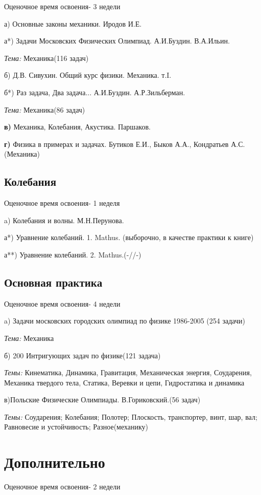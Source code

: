 \documentclass{article}
\begin{document}
\large{Оценочное время освоения- 3 недели

а) Основные законы механики. Иродов И.Е.

а*) Задачи Московских Физических Олимпиад. А.И.Буздин. В.А.Ильин.

\textit{Тема:} Механика(116 задач)

б) Д.В. Сивухин. Общий курс физики. Механика. т.I.

б*) Раз задача, Два задача... А.И.Буздин. А.Р.Зильберман.

\textit{Тема:} Механика(86 задач)

\textbf{в)} Механика, Колебания, Акустика. Паршаков.

\textbf{г)} Физика в примерах и задачах. Бутиков Е.И., Быков А.А., Кондратьев А.С. (Механика)

\subsection{Колебания}
Оценочное время освоения- 1 неделя

a) Колебания и волны. М.Н.Перунова.

а*) Уравнение колебаний. 1. Mathus. (выборочно, в качестве практики к книге)

а**) Уравнение колебаний. 2. Mathus.(-//-)

\subsection{Основная практика}
Оценочное время освоения- 4 недели

a) Задачи московских городских олимпиад по физике 1986-2005 (254 задачи)

\textit{Тема:} Механика

б) 200 Интригующих задач по физике(121 задача)

\textit{Темы:} Кинематика, Динамика, Гравитация, Механическая энергия, Соударения, Механика твердого тела, Статика, Веревки и цепи, Гидростатика и динамика

в)Польские Физические Олимпиады. В.Гориковский.(56 задач)

\textit{Темы:} Соударения; Колебания; Полотер; Плоскость, транспортер, винт, шар, вал; Равновесие и устойчивость; Разное(механику)

\Large\section{Дополнительно}
\large{
Оценочное время освоения- 2 недели

}}
\end{document}
